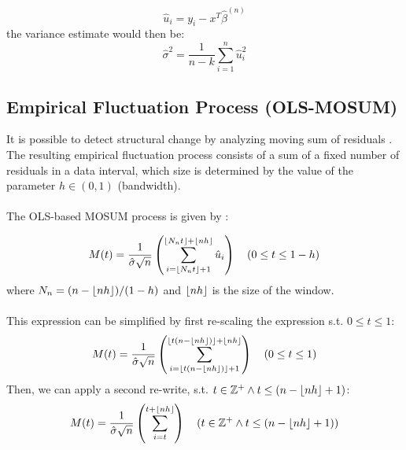 \documentclass[main.tex]{subfiles}
\begin{document}
\begin{equation} \label{eq:residuals}
\hat{u}_i = y_i - x^T\hat{\beta}^{(n)}
\end{equation}
the variance estimate would then be:
\begin{equation} \label{eq:sigma}
\hat{\sigma}^{2}=\frac{1}{n-k} \sum_{i=1}^{n} \hat{u}_{i}^{2}
\end{equation}

\subsection{Empirical Fluctuation Process (OLS-MOSUM)}
\label{subsec:empirical_fluctuation}
It is possible to detect structural change by analyzing moving sum of residuals
\cite{strucchange}. The resulting empirical fluctuation process consists of a
sum of a fixed number of residuals in a data interval, which size is determined
by the value of the parameter $h \in (0,1)$ (bandwidth). \\\\
The OLS-based MOSUM process is given by \cite{mosum_tests}:

\begin{equation}\label{eq:mosum_og}
M(t)=\frac{1}{\hat{\sigma} \sqrt{n}}
\left(\sum_{i=\lfloor N_{n} t\rfloor+1}^{\left\lfloor N_{n} t\right\rfloor+\lfloor
  n h\rfloor} \hat{u}_{i}\right) \quad(0 \leq t \leq 1-h)
\end{equation}
where $N_{n}=(n-\lfloor n h\rfloor) /(1-h)$ and $\lfloor n h\rfloor$ is the size of the
window. \\\\
This expression can be simplified by first re-scaling the
expression s.t. $0 \leq t \leq 1$:
\begin{equation}
  M(t) =
  \frac{1}{\hat{\sigma} \sqrt{n}}
  \left(\sum_{i=\lfloor t(n - \lfloor nh\rfloor)\rfloor + 1}^{\lfloor t(n - \lfloor nh\rfloor)\rfloor + \lfloor nh\rfloor}\right)
  \quad(0 \leq t \leq 1)
\end{equation}
Then, we can apply a second re-write, s.t.
$t \in \mathbb{Z}^+ \wedge t \leq (n - \lfloor nh\rfloor + 1)$:
\begin{equation} \label{eq:mosum}
  M(t) =
  \frac{1}{\hat{\sigma} \sqrt{n}}
  \left(\sum_{i=t}^{t + \lfloor nh\rfloor}\right)
  \quad(t \in \mathbb{Z}^+ \wedge t \leq (n - \lfloor nh\rfloor + 1))
\end{equation}
\end{document}
